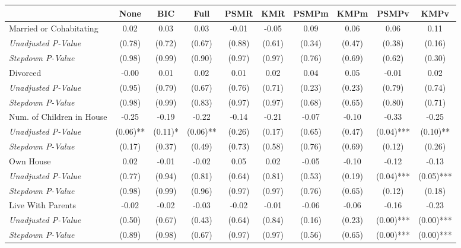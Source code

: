 \begin{tabular}{l c c c c c c c c c}
\toprule
 & None & BIC & Full & PSMR & KMR & PSMPm & KMPm & PSMPv & KMPv \\
\midrule
Married or Cohabitating & 0.02 & 0.03 & 0.03 & -0.01 & -0.05 & 0.09 & 0.06 & 0.06 & 0.11 \\
\quad \textit{Unadjusted P-Value} & (0.78) & (0.72) & (0.67) & (0.88) & (0.61) & (0.34) & (0.47) & (0.38) & (0.16) \\
\quad \textit{Stepdown P-Value} & (0.98) & (0.99) & (0.90) & (0.97) & (0.97) & (0.76) & (0.69) & (0.62) & (0.30) \\
Divorced & -0.00 & 0.01 & 0.02 & 0.01 & 0.02 & 0.04 & 0.05 & -0.01 & 0.02 \\
\quad \textit{Unadjusted P-Value} & (0.95) & (0.79) & (0.67) & (0.76) & (0.71) & (0.23) & (0.23) & (0.79) & (0.74) \\
\quad \textit{Stepdown P-Value} & (0.98) & (0.99) & (0.83) & (0.97) & (0.97) & (0.68) & (0.65) & (0.80) & (0.71) \\
Num. of Children in House & -0.25 & -0.19 & -0.22 & -0.14 & -0.21 & -0.07 & -0.10 & -0.33 & -0.25 \\
\quad \textit{Unadjusted P-Value} & (0.06)** & (0.11)* & (0.06)** & (0.26) & (0.17) & (0.65) & (0.47) & (0.04)*** & (0.10)** \\
\quad \textit{Stepdown P-Value} & (0.17) & (0.37) & (0.49) & (0.73) & (0.58) & (0.76) & (0.69) & (0.12) & (0.26) \\
Own House & 0.02 & -0.01 & -0.02 & 0.05 & 0.02 & -0.05 & -0.10 & -0.12 & -0.13 \\
\quad \textit{Unadjusted P-Value} & (0.77) & (0.94) & (0.81) & (0.64) & (0.81) & (0.53) & (0.19) & (0.04)*** & (0.05)*** \\
\quad \textit{Stepdown P-Value} & (0.98) & (0.99) & (0.96) & (0.97) & (0.97) & (0.76) & (0.65) & (0.12) & (0.18) \\
Live With Parents & -0.02 & -0.02 & -0.03 & -0.02 & -0.01 & -0.06 & -0.06 & -0.16 & -0.23 \\
\quad \textit{Unadjusted P-Value} & (0.50) & (0.67) & (0.43) & (0.64) & (0.84) & (0.16) & (0.23) & (0.00)*** & (0.00)*** \\
\quad \textit{Stepdown P-Value} & (0.89) & (0.98) & (0.67) & (0.97) & (0.97) & (0.56) & (0.65) & (0.00)*** & (0.00)*** \\
\bottomrule
\end{tabular}
